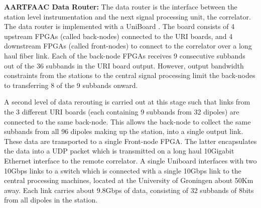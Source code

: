 \documentclass{ws-jai}
\begin{document}
\noindent  \textbf {AARTFAAC  Data Router:}  The  data router  is the  interface
between the station  level instrumentation and the next  signal processing unit,
the   correlator.    The   data   router  is   implemented   with   a   UniBoard
\citep{gunst2014application}.  The  board consists  of 4 upstream  FPGAs (called
back-nodes)  connected  to  the  URI  boards, and  4  downstream  FPGAs  (called
front-nodes) to connect to  the correlator over a long haul  fiber link. Each of
the back-node  FPGAs receives 9 consecutive  subbands out of the  36 subbands in
the URI board  output.  However, output bandwidth constraints  from the stations
to the central signal processing limit the back-nodes to transferring 8 of the 9
subbands onward.

A second level  of data rerouting is  carried out at this stage  such that links
from the 3 different URI boards (each containing 9 subbands from 32 dipoles) are
connected to the same back-node.  This  allows the back-node to collect the same
subbands from all 96  dipoles making up the station, into  a single output link.
These data are transported to a single Front-node FPGA.  The latter encapsulates
the  data into  a UDP  packet  which is  transmitted  on a  long haul  10Gigabit
Ethernet interface to the remote  correlator.  A single Uniboard interfaces with
two 10Gbps links to a switch which is connected with a single 10Gbps link to the
central processing machines,  located at the University of  Groningen about 50Km
away.  Each  link carries about  9.8Gbps of data,  consisting of 32  subbands of
8bits from all dipoles in the station.\\

\end{document}
